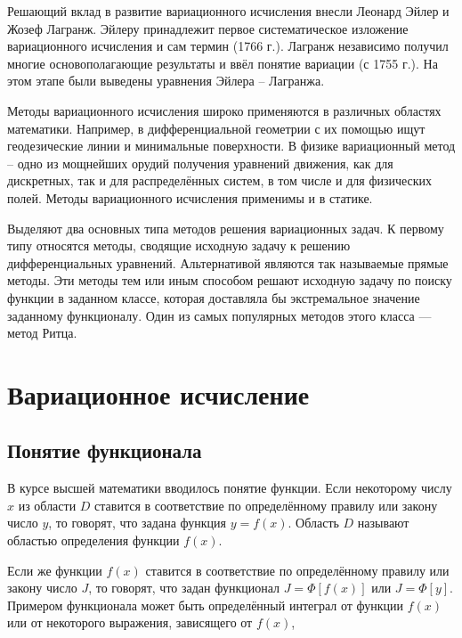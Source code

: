 \documentclass{article}
\begin{document}
Решающий вклад в развитие вариационного исчисления внесли Леонард Эйлер и Жозеф Лагранж. Эйлеру принадлежит первое систематическое изложение вариационного исчисления и сам термин (1766 г.). Лагранж независимо получил многие основополагающие результаты и ввёл понятие вариации (с 1755 г.). На этом этапе были выведены уравнения Эйлера – Лагранжа.

Методы вариационного исчисления широко применяются в различных областях математики. Например, в дифференциальной геометрии с их помощью ищут геодезические линии и минимальные поверхности. В физике вариационный метод – одно из мощнейших орудий получения уравнений движения, как для дискретных, так и для распределённых систем, в том числе и для физических полей. Методы вариационного исчисления применимы и в статике.

Выделяют два основных типа методов решения вариационных задач. К первому типу относятся методы, сводящие исходную задачу к решению дифференциальных уравнений. Альтернативой являются так называемые прямые методы. Эти методы тем или иным способом решают исходную задачу по поиску функции в заданном классе, которая доставляла бы экстремальное значение заданному функционалу. Один из самых популярных методов этого класса — метод Ритца.


\newpage

\section{Вариационное исчисление}

\subsection{Понятие функционала}

В курсе высшей математики вводилось понятие функции. Если некоторому числу $x$ из области $D$ ставится в соответствие по определённому правилу или закону число $y$, то говорят, что задана функция $y=f(x)$. Область $D$ называют областью определения функции $f(x)$.

Если же функции $f(x)$ ставится в соответствие по определённому правилу или закону число $J$, то говорят, что задан функционал $J = \Phi[f(x)]$ или 
$J = \Phi[y]$. Примером функционала может быть определённый интеграл от функции $f(x)$ или от некоторого выражения, зависящего от $f(x)$,
\end{document}
